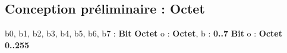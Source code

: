 \subsection{Conception préliminaire : Octet}

\begin{algorithme}
    {b0, b1, b2, b3, b4, b5, b6, b7 : \textbf{Bit}}
    {\textbf{Octet}}
    {}
    {o : \textbf{Octet}, b : \textbf{0..7}}
    {\textbf{Bit}}
    {}
    {o : \textbf{Octet}}
    {\textbf{0..255}}
    {}
\end{algorithme}
